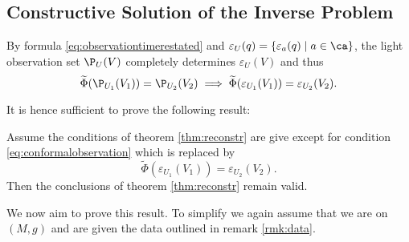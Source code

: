 \subsection{Constructive Solution of the Inverse Problem}
By formula \eqref{eq:observationtimerestated} and $\varepsilon_U(q) = \{\varepsilon_a(q) \mid a\in \ca \}$, the light observation set $\P_U(V)$ completely determines $\varepsilon_U(V)$ and thus 
\[
\widetilde{\Phi}(\P_{U_1}(V_1)) = \P_{U_2}(V_2) \implies \widetilde{\Phi}(\varepsilon_{U_1}(V_1)) = \varepsilon_{U_2}(V_2).
\]

It is hence sufficient to prove the following result:
\begin{theorem}
Assume the conditions of theorem \ref{thm:reconstr} are give except for condition \eqref{eq:conformalobservation} which is replaced by
\[
    \widetilde{\Phi}(\varepsilon_{U_1}(V_1)) = \varepsilon_{U_2}(V_2).
\]
Then the conclusions of theorem \ref{thm:reconstr} remain valid.
\end{theorem}

We now aim to prove this result. To simplify we again assume that we are on $(M,g)$ and are given the data outlined in remark \ref{rmk:data}.

